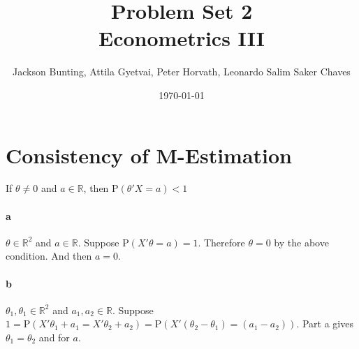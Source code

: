 \documentclass[11pt,letterpaper]{article}                  %
\title{Problem Set 2 \\ \medskip \Large{Econometrics III}}
\author{\Large Jackson Bunting, Attila Gyetvai, Peter Horvath, Leonardo Salim Saker Chaves}
\date{\today}
\begin{document}
\maketitle
\section{Consistency of M-Estimation} 


\begin{problem}
\end{problem}

\bigskip
\begin{problem}
If $\theta \neq 0$ and $a \in \mathbb{R}$, then
$\mathrm{P}(\theta' X = a) < 1$
\paragraph*{a}
$\theta \in \mathbb{R}^2$ and $a \in \mathbb{R}$. Suppose
$\mathrm{P}(X'\theta = a) = 1$. Therefore $\theta = 0$ by the above
condition. And then $a = 0$.

\paragraph*{b}
$\theta_1,\theta_1 \in \mathbb{R}^2$ and $a_1,a_2 \in
\mathbb{R}$. Suppose $1 = \mathrm{P}(X'\theta_1 + a_1 = X'\theta_2 +
a_2) = \mathrm{P}\left(X'(\theta_2-\theta_1) = (a_1-a_2)\right)$. Part
a gives $\theta_1 = \theta_2$ and for $a$.
\end{problem}

\bigskip
\begin{problem}
\end{problem}

\end{document}
